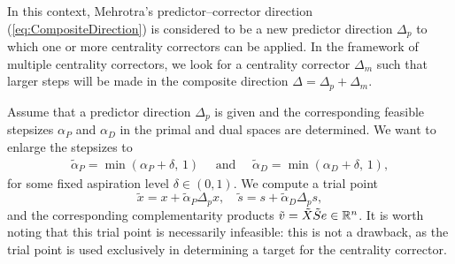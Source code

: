 

In this context, Mehrotra's predictor--corrector direction 
(\ref{eq:CompositeDirection}) is considered to be a new predictor direction
$\Delta_p$ to which one or more centrality correctors can be applied. 
In the framework of multiple centrality correctors, we look for a 
centrality corrector $\Delta_m$ such that larger
steps will be made in the composite direction $\Delta = \Delta_p + \Delta_m$.

Assume that a predictor direction $\Delta_p$ is given and the corresponding
feasible stepsizes $\alpha_{P}$ and $\alpha_{D}$ 
in the primal and dual spaces are determined. 
We want to enlarge the stepsizes to 
%
\begin{eqnarray*} 
   \tilde{\alpha}_{P} = \min(\alpha_{P} \! + \! \delta, \,1) 
   \quad \mbox{ and } \quad
   \tilde{\alpha}_{D} = \min(\alpha_{D} \! + \! \delta, \,1), 
\end{eqnarray*}
%
for some fixed aspiration level $\delta \in(0,1)$. We compute a trial point
%
\[
  \tilde{x} = x + \tilde{\alpha}_{P} \Delta_{p} x, \quad 
  \tilde{s} = s + \tilde{\alpha}_{D} \Delta_{p} s,
\]
%
and the corresponding complementarity products 
$\tilde v = \tilde X \tilde S e \in \mathbb{R}^{n}$.
It is worth noting that this trial point is necessarily infeasible: 
this is not a drawback, as the trial point is used exclusively in
determining a target for the centrality corrector.

